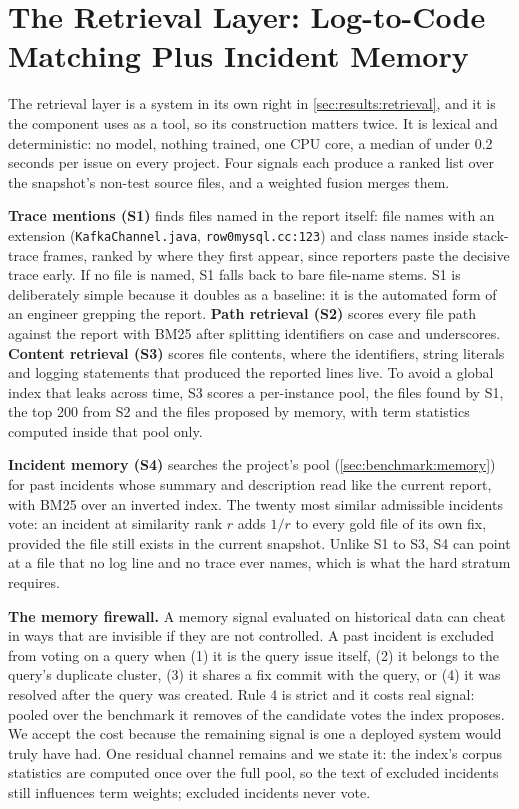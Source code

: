 \section{The Retrieval Layer: Log-to-Code Matching Plus Incident Memory}
\label{sec:approach}

The retrieval layer is a system in its own right in
\cref{sec:results:retrieval}, and it is the component \sys{} uses as a
tool, so its construction matters twice. It is lexical and
deterministic: no model, nothing trained, one CPU core, a median of under
0.2 seconds per issue on every project. Four signals each produce a ranked list over the
snapshot's non-test source files, and a weighted fusion merges them.

\textbf{Trace mentions (S1)} finds files named in the report itself:
file names with an extension (\texttt{KafkaChannel.java},
\texttt{row0mysql.cc:123}) and class names inside stack-trace frames,
ranked by where they first appear, since reporters paste the decisive
trace early. If no file is named, S1 falls back to bare file-name
stems. S1 is deliberately simple because it doubles as a baseline: it
is the automated form of an engineer grepping the report.
\textbf{Path retrieval (S2)} scores every file path against the report
with BM25 after splitting identifiers on case and underscores.
\textbf{Content retrieval (S3)} scores file contents, where the
identifiers, string literals and logging statements that produced the
reported lines live. To avoid a global index that leaks across time, S3
scores a per-instance pool, the files found by S1, the top 200 from S2
and the files proposed by memory, with term statistics computed inside
that pool only.

\label{sec:approach:memory}
\textbf{Incident memory (S4)} searches the project's pool
(\cref{sec:benchmark:memory}) for past incidents whose summary and
description read like the current report, with BM25 over an inverted
index. The twenty most similar admissible incidents vote: an incident
at similarity rank $r$ adds $1/r$ to every gold file of its own fix,
provided the file still exists in the current snapshot. Unlike S1 to
S3, S4 can point at a file that no log line and no trace ever names,
which is what the hard stratum requires.

\label{sec:approach:firewall}
\textbf{The memory firewall.} A memory signal evaluated on historical
data can cheat in ways that are invisible if they are not controlled.
A past incident is excluded from voting on a query when (1) it is the
query issue itself, (2) it belongs to the query's duplicate cluster,
(3) it shares a fix commit with the query, or (4) it was resolved after
the query was created. Rule 4 is strict and it costs real signal:
pooled over the benchmark it removes \firewallPct{} of the candidate
votes the index proposes. We accept the cost because the remaining
signal is one a deployed system would truly have had. One residual
channel remains and we state it: the index's corpus statistics are
computed once over the full pool, so the text of excluded incidents
still influences term weights; excluded incidents never vote.

